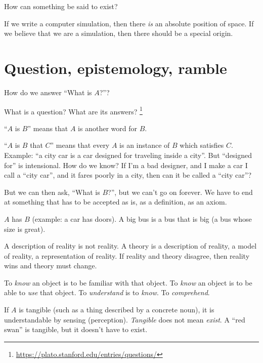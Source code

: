 How can something be said to exist?


If we write a computer simulation, then there \emph{is} an absolute position of space.
If we believe that we are a simulation, then there should be a special origin.

\section{Question, epistemology, ramble}

How do we answer ``What is \(A\)?''?

What is a question?
What are its answers?%
\footnote{\url{https://plato.stanford.edu/entries/questions/}}

``\(A\) is \(B\)'' means that \(A\) is another word for \(B\).

``\(A\) is \(B\) that \(C\)''
means that every \(A\) is an instance of \(B\) which satisfies \(C\).
Example: ``a city car is a car designed for traveling inside a city''.
But ``designed for'' is intensional.
How do we know?
If I'm a bad designer, and I make a car I call a ``city car'',
and it fares poorly in a city, then can it be called a ``city car''?

But we can then ask, ``What is \(B\)?'',
but we can't go on forever.
We have to end at something that has to be accepted as is, as a definition, as an axiom.

\(A\) has \(B\) (example: a car has doors).
A big bus is a bus that is big (a bus whose size is great).

A description of reality is not reality.
A theory is a description of reality, a model of reality, a representation of reality.
If reality and theory disagree, then reality wins and theory must change.

To \emph{know} an object is to be familiar with that object.
To \emph{know} an object is to be able to \emph{use} that object.
To \emph{understand} is to \emph{know}.
To \emph{comprehend}.

If \(A\) is tangible (such as a thing described by a concrete noun), it is understandable by sensing (perception).
\emph{Tangible} does not mean \emph{exist}.
A ``red swan'' is tangible, but it doesn't have to exist.

